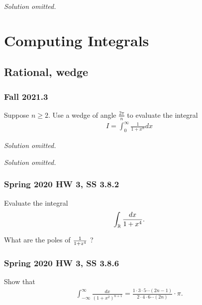 \emph{Solution omitted.}

\hypertarget{computing-integrals}{%
\section{Computing Integrals}\label{computing-integrals}}

\hypertarget{rational-wedge}{%
\subsection{Rational, wedge}\label{rational-wedge}}

\hypertarget{fall-2021.3}{%
\subsubsection{Fall 2021.3}\label{fall-2021.3}}

\begin{problem}[?]

Suppose \(n \geq 2\). Use a wedge of angle \(\frac{2 \pi}{n}\) to
evaluate the integral
\begin{align*}
I=\int_{0}^{\infty} \frac{1}{1+x^{n}} d x
\end{align*}

\end{problem}

\emph{Solution omitted.}

\emph{Solution omitted.}

\hypertarget{spring-2020-hw-3-ss-3.8.2}{%
\subsubsection{Spring 2020 HW 3, SS
3.8.2}\label{spring-2020-hw-3-ss-3.8.2}}

Evaluate the integral
\begin{align*}
\int_\mathbb{R} {dx \over 1 + x^4}
.\end{align*}

What are the poles of \({1\over 1 + z^4}\) ?

\hypertarget{spring-2020-hw-3-ss-3.8.6}{%
\subsubsection{Spring 2020 HW 3, SS
3.8.6}\label{spring-2020-hw-3-ss-3.8.6}}

Show that
\begin{align*}
\int_{-\infty}^{\infty} \frac{d x}{\left(1+x^{2}\right)^{n+1}}=\frac{1 \cdot 3 \cdot 5 \cdots(2 n-1)}{2 \cdot 4 \cdot 6 \cdots(2 n)} \cdot \pi
.\end{align*}

